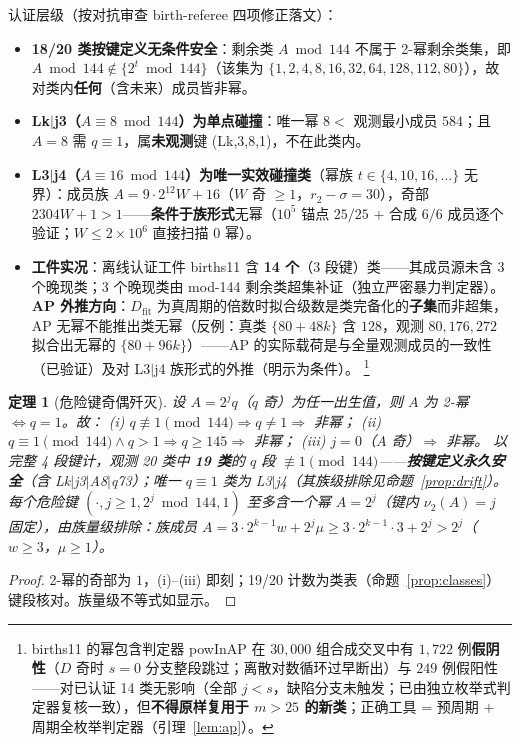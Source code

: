 \documentclass[11pt]{ctexart}
\newtheorem{theorem}{定理}[section]
\theoremstyle{definition}
\newcommand{\vtwo}[1]{\nu_2(#1)}
\begin{document}
认证层级（按对抗审查 birth-referee 四项修正落文）：
\begin{itemize}
\item \textbf{18/20 类按键定义无条件安全}：剩余类 $A\bmod144$ 不属于 2-幂剩余类集，即 $A\bmod144\notin\{2^t\bmod144\}$（该集为 $\{1,2,4,8,16,32,64,128,112,80\}$），故对类内\textbf{任何}（含未来）成员皆非幂。
\item \textbf{Lk$|$j3（$A\equiv8\bmod144$）为单点碰撞}：唯一幂 $8<$ 观测最小成员 $584$；且 $A=8$ 需 $q\equiv1$，属\textbf{未观测}键 (Lk,3,8,1)，不在此类内。
\item \textbf{L3$|$j4（$A\equiv16\bmod144$）为唯一实效碰撞类}（幂族 $t\in\{4,10,16,\dots\}$ 无界）：成员族 $A=9\cdot2^{12}W+16$（$W$ 奇 $\ge1$，$r_2-\sigma=30$），奇部 $2304W+1>1$——\textbf{条件于族形式}无幂（$10^5$ 锚点 $25/25$ $+$ 合成 $6/6$ 成员逐个验证；$W\le2\times10^6$ 直接扫描 0 幂）。
\item \textbf{工件实况}：离线认证工件 births11 含 \textbf{14 个}（3 段键）类——其成员源未含 3 个晚现类；3 个晚现类由 mod-144 剩余类超集补证（独立严密暴力判定器）。\textbf{AP 外推方向}：$D_{\mathrm{fit}}$ 为真周期的倍数时拟合级数是类完备化的\textbf{子集}而非超集，AP 无幂不能推出类无幂（反例：真类 $\{80+48k\}$ 含 $128$，观测 $80,176,272$ 拟合出无幂的 $\{80+96k\}$）——AP 的实际载荷是与全量观测成员的一致性（已验证）及对 L3$|$j4 族形式的外推（明示为条件）。
\footnote{births11 的幂包含判定器 powInAP 在 $30{,}000$ 组合成交叉中有 $1{,}722$ 例\textbf{假阴性}（$D$ 奇时 $s{=}0$ 分支整段跳过；离散对数循环过早断出）与 $249$ 例假阳性——对已认证 14 类无影响（全部 $j<s$，缺陷分支未触发；已由独立枚举式判定器复核一致），但\textbf{不得原样复用于 $m>25$ 的新类}；正确工具 = 预周期 $+$ 周期全枚举判定器（引理~\ref{lem:ap}）。}
\end{itemize}

\begin{theorem}[危险键奇偶歼灭]\label{thm:parity}
设 $A=2^{j}q$（$q$ 奇）为任一出生值，则 $A$ 为 2-幂 $\iff q=1$。故：
(i) $q\not\equiv1\pmod{144}\Rightarrow q\ne1\Rightarrow$ 非幂；
(ii) $q\equiv1\pmod{144}\wedge q>1\Rightarrow q\ge145\Rightarrow$ 非幂；
(iii) $j=0$（$A$ 奇）$\Rightarrow$ 非幂。
以完整 4 段键计，观测 20 类中 \textbf{19 类}的 $q$ 段 $\not\equiv1\pmod{144}$——\textbf{按键定义永久安全}（含 Lk$|$j3$|$A8$|$q73）；唯一 $q\equiv1$ 类为 L3$|$j4（其族级排除见命题~\ref{prop:drift}）。每个危险键 $(\cdot,j\ge1,2^j\bmod144,1)$ 至多含一个幂 $A=2^j$（键内 $\vtwo{A}=j$ 固定），由族量级排除：族成员 $A=3\cdot2^{k-1}w+2^{j}\mu\ge3\cdot2^{k-1}\cdot3+2^{j}>2^{j}$（$w\ge3$，$\mu\ge1$）。
\end{theorem}
\begin{proof}
2-幂的奇部为 $1$，(i)--(iii) 即刻；19/20 计数为类表（命题~\ref{prop:classes}）键段核对。族量级不等式如显示。
\end{proof}
\end{document}
